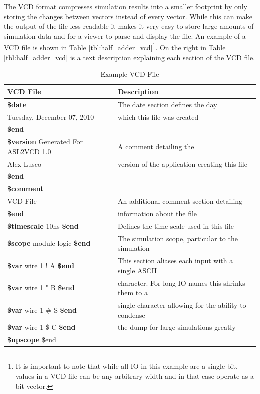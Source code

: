 \documentclass[12pt]{report}
\begin{document}
The VCD format compresses simulation results into a smaller footprint by only storing the changes between vectors instead of every vector\cite{verilog}.  While this can make the output of the file less readable it makes it very easy to store large amounts of simulation data and for a viewer to parse and display the file.  An example of a VCD file is shown in Table \ref{tbl:half_adder_vcd}\footnote{It is important to note that while all IO in this example are a single bit, values in a VCD file can be any arbitrary width and in that case operate as a bit-vector.}.  On the right in Table \ref{tbl:half_adder_vcd} is a text description explaining each section of the VCD file.
\begin{table}
	\begin{center}
    \caption{Example VCD File}
		\begin{tabular}{l|l}
			VCD File & Description \\ \hline
			\textbf{\$date} & The date section defines the day\\
			Tuesday, December 07, 2010 & which this file was created \\
			\textbf{\$end} & \\
			\textbf{\$version}
			Generated For ASL2VCD 1.0 & A comment detailing the  \\
			Alex Lusco & version of the application creating this file \\
			\textbf{\$end}	\\
			\textbf{\$comment}	\\
			VCD File & An additional comment section detailing \\
			\textbf{\$end} & information about the file \\
			\textbf{\$timescale} 10ns \textbf{\$end} & Defines the time scale used in this file \\
			\textbf{\$scope} module logic \textbf{\$end} & The simulation scope, particular to the simulation \\
			\textbf{\$var} wire 1 ! A \textbf{\$end} & This section aliases each input with a single ASCII \\
			\textbf{\$var} wire 1 " B \textbf{\$end} & character. For long IO names this shrinks them to a  \\
			\textbf{\$var} wire 1 \# S \textbf{\$end} & single character allowing for the ability to condense \\
			\textbf{\$var} wire 1 \$ C \textbf{\$end} & the dump for large simulations greatly \\
			\textbf{\$upscope} \$end & \\

\end{tabular}
\end{center}
\end{table}
\end{document}
